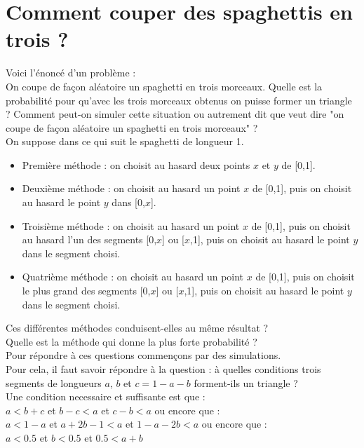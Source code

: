 \documentclass[a4paper,11pt]{book}
\begin{document}
\section{Comment couper des spaghettis en trois ?}
Voici l'\'enonc\'e d'un probl\`eme :\\
On coupe de fa\c{c}on al\'eatoire un spaghetti en trois morceaux. Quelle est
la probabilit\'e pour qu'avec les trois morceaux obtenus on puisse former un triangle ?
Comment peut-on simuler cette situation ou autrement dit que veut dire "on coupe de fa\c{c}on al\'eatoire un spaghetti en trois morceaux" ?\\
On suppose dans ce qui suit le spaghetti de longueur 1.
\begin{itemize}
\item Premi\`ere m\'ethode : on choisit au hasard deux points $x$ et $y$ de 
[0,1].
\item Deuxi\`eme m\'ethode : on choisit au hasard un point $x$ de [0,1], puis 
on choisit au hasard le point $y$ dans [0,$x$].
\item Troisi\`eme m\'ethode : on choisit au hasard un point $x$ de [0,1], puis 
on choisit au hasard l'un des segments [0,$x$] ou [$x$,1], puis on choisit 
au hasard le point $y$ dans le segment choisi.
\item Quatri\`eme m\'ethode : on choisit au hasard un point $x$ de [0,1], puis 
on choisit le plus grand des segments [0,$x$] ou [$x$,1], puis on choisit 
au hasard le point $y$ dans le segment choisi.
\end{itemize}
Ces diff\'erentes m\'ethodes conduisent-elles au m\^eme r\'esultat ?\\
Quelle est la m\'ethode qui donne la plus forte probabilit\'e ?\\
Pour r\'epondre \`a ces questions commen\c{c}ons par des simulations.\\
Pour cela, il faut savoir r\'epondre \`a la question : \`a quelles conditions 
trois segments de longueurs $a$, $b$ et  $c=1-a-b$ forment-ils un triangle ?\\
Une condition necessaire et suffisante est que :\\
 $a<b+c$ et $b-c<a$ et $c-b<a$ ou encore que : \\
$a<1-a$ et $a+2b-1<a$ et $1-a-2b<a$ ou encore que : \\
$a<0.5$ et $b<0.5$ et $0.5<a+b$
\end{document}

